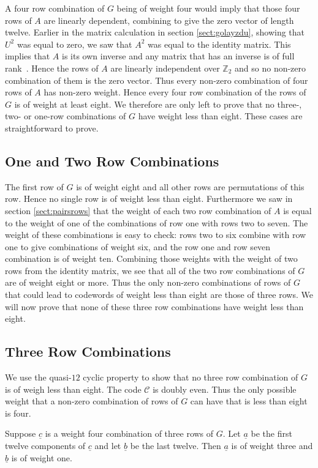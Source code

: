 A four row combination of $G$ being of weight four would imply that those four rows of $A$ are linearly dependent, combining to give the zero vector of length twelve.
Earlier in the matrix calculation in section \ref{sect:golayzdu}, showing that $U^2$ was equal to zero, we saw that $A^2$ was equal to the identity matrix.
This implies that $A$ is its own inverse and any matrix that has an inverse is of full rank~\cite[p.~246]{mac99}.
Hence the rows of $A$ are linearly independent over $\mathbb{Z}_2$ and so no non-zero combination of them is the zero vector.
Thus every non-zero combination of four rows of $A$ has non-zero weight.
Hence every four row combination of the rows of $G$ is of weight at least eight.
We therefore are only left to prove that no three-, two- or one-row combinations of $G$ have weight less than eight.
These cases are straightforward to prove.

\subsection{One and Two Row Combinations}
\label{sect:onetworowcombs}
The first row of $G$ is of weight eight and all other rows are permutations of this row.
Hence no single row is of weight less than eight.
Furthermore we saw in section \ref{sect:pairsrows} that the weight of each two row combination of $A$ is equal to the weight of one of the combinations of row one with rows two to seven.
The weight of these combinations is easy to check: rows two to six combine with row one to give combinations of weight six, and the row one and row seven combination is of weight ten.
Combining those weights with the weight of two rows from the identity matrix, we see that all of the two row combinations of $G$ are of weight eight or more.
Thus the only non-zero combinations of rows of $G$ that could lead to codewords of weight less than eight are those of three rows.
We will now prove that none of these three row combinations have weight less than eight.

\subsection{Three Row Combinations}
We use the quasi-$12$ cyclic property to show that no three row combination of $G$ is of weigh less than eight.
The code $\mathcal{C}$ is doubly even.
Thus the only possible weight that a non-zero combination of rows of $G$ can have that is less than eight is four.

Suppose $\underline{c}$ is a weight four combination of three rows of $G$.
Let $\underline{a}$ be the first twelve components of $\underline{c}$ and let $\underline{b}$ be the last twelve.
Then $\underline{a}$ is of weight three and $\underline{b}$ is of weight one.


